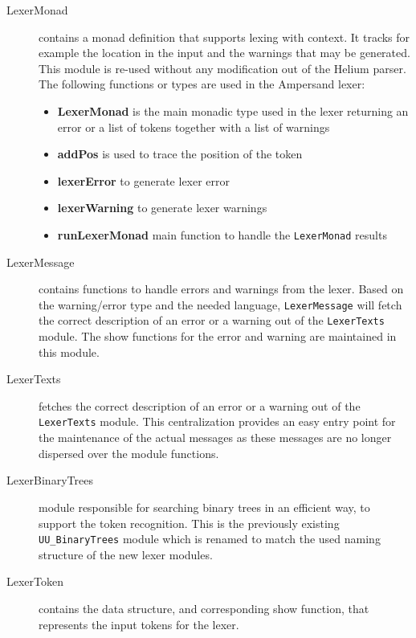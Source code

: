  \begin{description}
 
    \item[LexerMonad] contains a monad definition that supports lexing with context.
      It tracks for example the location in the input and the warnings that may be generated.
	  This module is re-used without any modification out of the  Helium parser.
      The following functions or types are used in the Ampersand lexer:
	  \begin{itemize}
		\item \textbf{LexerMonad} is the main monadic type used in the lexer returning an error or a list of tokens together with a list of warnings
		\item \textbf{addPos} is used to trace the position of the token
		\item \textbf{lexerError} to generate lexer error
		\item \textbf{lexerWarning} to generate lexer warnings
		\item \textbf{runLexerMonad} main function to handle the \texttt{LexerMonad} results 
	  \end{itemize}
	  
    \item[LexerMessage] contains functions to handle errors and warnings from the lexer.
	  Based on the warning/error type and the needed language, \texttt{LexerMessage} will fetch the correct description of an error or a warning out of the \texttt{LexerTexts} module.
	  The show functions for the error and warning are maintained in this module.
	  
    \item[LexerTexts] fetches the correct description of an error or a warning out of the \texttt{LexerTexts} module.
	  This centralization provides an easy entry point for the maintenance of the actual messages as these messages are no longer dispersed over the module functions.
	  
    \item[LexerBinaryTrees] module responsible for searching binary trees in an efficient way, to support the token recognition.
    This is the previously existing \texttt{UU\_BinaryTrees} module which is renamed to match the used naming structure of the new lexer modules.

    \item[LexerToken] contains the data structure, and corresponding show function, that represents the input tokens for the lexer.
	
  \end{description}


